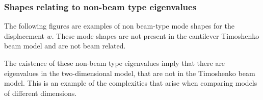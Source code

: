 \documentclass[../../main.tex]{subfiles}
\begin{document}
\subsubsection{Shapes relating to non-beam type eigenvalues}
The following figures are examples of non beam-type mode shapes for the displacement $w$. These mode shapes are not present in the cantilever Timoshenko beam model and are not beam related. 
\begin{figure}[h!]
\end{figure}
\FloatBarrier

The existence of these non-beam type eigenvalues imply that there are eigenvalues in the two-dimensional model, that are not in the Timoshenko beam model. This is an example of the complexities that arise when comparing models of different dimensions.
\end{document}
